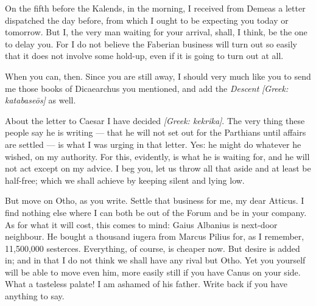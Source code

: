 

 On the fifth before the Kalends, in the morning, I received from Demeas a letter dispatched the day before, from which I ought to be expecting you today or tomorrow. But I, the very man waiting for your arrival, shall, I think, be the one to delay you. For I do not believe the Faberian business will turn out so easily that it does not involve some hold-up, even if it is going to turn out at all.

 When you can, then. Since you are still away, I should very much like you to send me those books of Dicaearchus you mentioned, and add the \textit{Descent} \textit{[Greek: katabaseōs]} as well.

 About the letter to Caesar I have decided \textit{[Greek: kekrika]}. The very thing these people say he is writing --- that he will not set out for the Parthians until affairs are settled --- is what I was urging in that letter. Yes: he might do whatever he wished, on my authority. For this, evidently, is what he is waiting for, and he will not act except on my advice. I beg you, let us throw all that aside and at least be half-free; which we shall achieve by keeping silent and lying low.

 But move on Otho, as you write. Settle that business for me, my dear Atticus. I find nothing else where I can both be out of the Forum and be in your company. As for what it will cost, this comes to mind: Gaius Albanius is next-door neighbour. He bought a thousand iugera from Marcus Pilius for, as I remember, 11,500,000 sesterces. Everything, of course, is cheaper now. But desire is added in; and in that I do not think we shall have any rival but Otho. Yet you yourself will be able to move even him, more easily still if you have Canus on your side. What a tasteless palate! I am ashamed of his father. Write back if you have anything to say.

